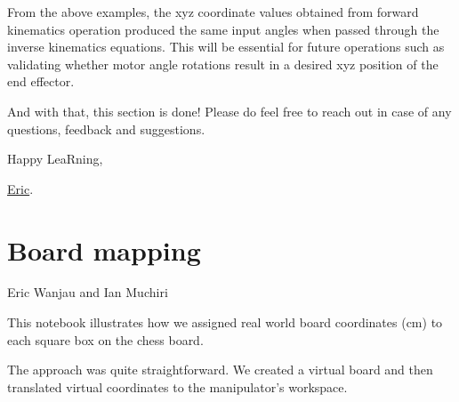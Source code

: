 \documentclass[
  letterpaper,
  DIV=11,
  numbers=noendperiod]{scrreprt}
\begin{document}
From the above examples, the xyz coordinate values obtained from forward
kinematics operation produced the same input angles when passed through
the inverse kinematics equations. This will be essential for future
operations such as validating whether motor angle rotations result in a
desired xyz position of the end effector.

And with that, this section is done! Please do feel free to reach out in
case of any questions, feedback and suggestions.

Happy LeaRning,

\href{https://twitter.com/ericntay}{Eric}.


\hypertarget{board-mapping}{%
\chapter{Board mapping}\label{board-mapping}}

Eric Wanjau and Ian Muchiri

\hfill\break

This notebook illustrates how we assigned real world board coordinates
(cm) to each square box on the chess board.

The approach was quite straightforward. We created a virtual board and
then translated virtual coordinates to the manipulator's workspace.
\end{document}
